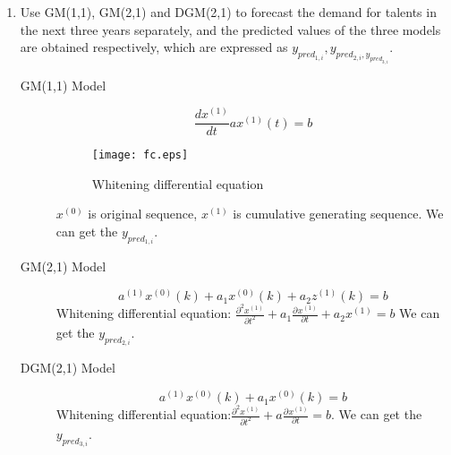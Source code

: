 \documentclass{mcmthesis}
\begin{document}
\begin{enumerate}
	\item Use GM(1,1), GM(2,1) and DGM(2,1) to forecast the demand for talents in the next three years separately, and the predicted values of the three models are obtained respectively, which are expressed as $y_{pred_{1,i}}, y_{pred_{2,i}, y_{pred_{3,i}}}$.
	\begin{description}
		\item[GM(1,1) Model] 
		\begin{equation}
		\frac{{d{x^{(1)}}}}{{dt}}a{x^{(1)}}(t) = b
		\end{equation}

	
	\begin{figure}[h]
		\centering
		\texttt{[image: fc.eps]}
		\caption{Whitening differential equation} \label{fig:fc}
	\end{figure}

		${x^{(0)}}$ is original sequence, ${x^{(1)}} $ is cumulative generating sequence. We can get the $y_{pred_{1,i}}$.
		
		\item[GM(2,1) Model] 
		\begin{equation}
		a^{(1)}x^{(0)}(k)+a_1 x^(0)(k)+a_2z^(1)(k)=b
		\end{equation}
		Whitening differential equation:
		$\frac{{{\partial ^2}{x^{(1)}}}}{{\partial {t^2}}} + {a_1}\frac{{{\partial ^{}}{x^{(1)}}}}{{\partial {t^{}}}} + {a_2}{x^{(1)}} = b$
		We can get the $y_{pred_{2,i}}$.
		
		\item[DGM(2,1) Model] 
		\begin{equation}
		{a^{(1)}}{x^{(0)}}(k) + {a_1}{x^{(0)}}(k) = b
		\end{equation}
		Whitening differential equation:$\frac{{{\partial ^2}{x^{(1)}}}}{{\partial {t^2}}} + a\frac{{{\partial ^{}}{x^{(1)}}}}{{\partial {t^{}}}} = b$. We can get the $y_{pred_{3,i}}$.
		

\end{description}
\end{enumerate}
\end{document}
